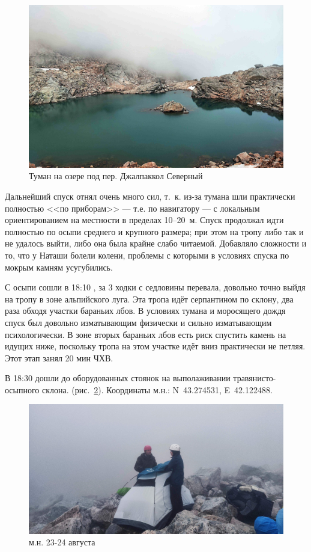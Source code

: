 \begin{figure}[h!]	
	\centering
	\includegraphics[angle=0, width=0.7\linewidth]{../pics/IMG_20240823_170306}
	\caption{Туман на озере под пер. Джалпаккол Северный}
	\label{fig:IMG_20240823_170306}
\end{figure} 

Дальнейший спуск отнял очень много сил, т.~к. из-за тумана шли практически полностью <<по приборам>> --- т.е. по навигатору --- с локальным ориентированием на местности в пределах 10--20~м. Спуск продолжал идти полностью по осыпи среднего и крупного размера; при этом на тропу либо так и не удалось выйти, либо она была крайне слабо читаемой. Добавляло сложности и то, что у Наташи болели колени, проблемы с которыми в условиях спуска по мокрым камням усугубились. 

С осыпи сошли в 18:10 , за 3 ходки с седловины перевала, довольно точно выйдя на тропу в зоне альпийского луга. Эта тропа идёт серпантином по склону, два раза обходя участки бараньих лбов. В условиях тумана и моросящего дождя спуск был довольно изматывающим физически и сильно изматывающим психологически. В зоне вторых бараньих лбов есть риск спустить камень на идущих ниже, поскольку тропа на этом участке идёт вниз практически не петляя. Этот этап занял 20 мин ЧХВ.

В 18:30 дошли до оборудованных стоянок на выполаживании травянисто-осыпного склона. (рис.~\ref{fig:IMG_20240823_184041}). Координаты м.н.: N~43.274531\degree, E~42.122488\degree.

\begin{figure}[h!]	
	\centering
	\includegraphics[angle=0, width=0.7\linewidth]{../pics/IMG_20240823_184041}
	\caption{м.н. 23-24 августа}
	\label{fig:IMG_20240823_184041}
\end{figure}

